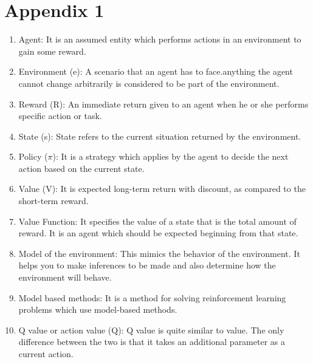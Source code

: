 \chapter{Appendix 1}

\begin{enumerate}

    \item{ Agent: It is an assumed entity which performs actions in an environment to gain some reward.}
    \item{Environment (e): A scenario that an agent has to face.anything the agent  cannot change arbitrarily is considered to be part of the environment.} 
    \item{Reward (R): An immediate return given to an agent when he or she performs specific action or task.}
    \item{ State (s): State refers to the current situation returned by the environment.}
    \item{Policy ($\pi$): It is a strategy which applies by the agent to decide the next action based on the current state.}
    \item{ Value (V): It is expected long-term return with discount, as compared to the short-term reward.}
    \item{ Value Function: It	specifies the value of a state that is the total amount of reward. It is an agent which should be expected beginning from that state.}
    \item{ Model of the environment: This mimics the behavior of the environment. It helps you to make inferences to be made and also determine how the environment will behave.}
    \item{ Model based methods: It is a method for solving reinforcement learning problems which use model-based methods.}
    \item{ Q value or action value (Q): Q value is quite similar to value. The only difference between the two is that it takes an additional parameter as a current action.}
\end{enumerate}

